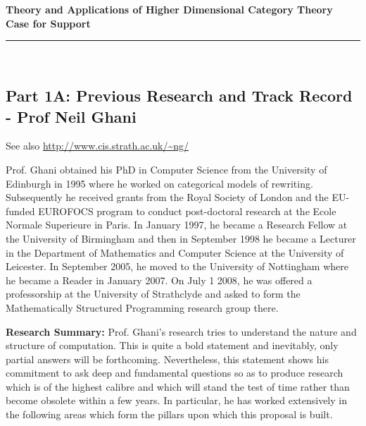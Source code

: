 \documentclass[a4paper,10pt]{article}
\begin{document}
\thispagestyle{plain}
\begin{center}
  {\Large {\bf Theory and Applications of Higher Dimensional Category Theory}}\\ {\Large \bf Case for Support}\\[1ex]
  \rule{140mm}{.5mm}\\[2ex]
\end{center}

\vspace*{-0.2in}

\subsection*{Part 1A: Previous Research and Track Record - Prof Neil Ghani}
See also \url{http://www.cis.strath.ac.uk/~ng/}

Prof. Ghani obtained his PhD in Computer Science from the University
of Edinburgh in 1995 where he worked on categorical models of
rewriting.  Subsequently he received grants from the Royal Society of
London and the EU-funded EUROFOCS program to conduct post-doctoral
research at the Ecole Normale Superieure in Paris. In January 1997, he
became a Research Fellow at the University of Birmingham and then in
September 1998 he became a Lecturer in the Department of Mathematics
and Computer Science at the University of Leicester. In September
2005, he moved to the University of Nottingham where he became a
Reader in January 2007. On July 1 2008, he was offered a professorship
at the University of Strathclyde and asked to form the Mathematically
Structured Programming research group there.

{\bf Research Summary:} Prof. Ghani's research tries to understand the
nature and structure of computation. This is quite a bold statement
and inevitably, only partial answers will be
forthcoming. Nevertheless, this statement shows his
commitment to ask deep and fundamental questions so as to produce
research which is of the highest calibre and which will stand the test
of time rather than become obsolete within a few years. In particular,
he has worked extensively in the following areas which form the
pillars upon which this proposal is built.
\end{document}
